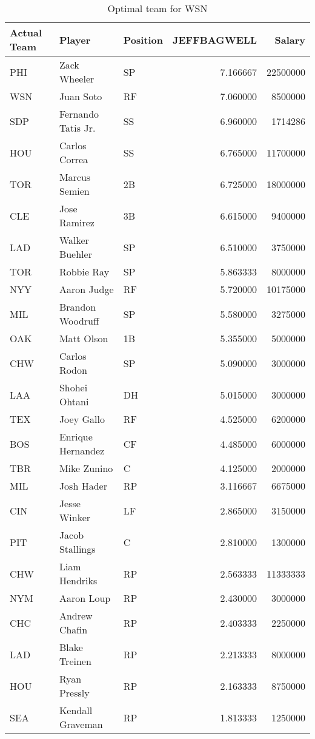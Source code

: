 \begin{table}

\caption{Optimal team for WSN}
\centering
\begin{tabular}[t]{l|l|l|r|r}
\hline
Actual Team & Player & Position & JEFFBAGWELL & Salary\\
\hline
PHI & Zack Wheeler & SP & 7.166667 & 22500000\\
\hline
WSN & Juan Soto & RF & 7.060000 & 8500000\\
\hline
SDP & Fernando Tatis Jr. & SS & 6.960000 & 1714286\\
\hline
HOU & Carlos Correa & SS & 6.765000 & 11700000\\
\hline
TOR & Marcus Semien & 2B & 6.725000 & 18000000\\
\hline
CLE & Jose Ramirez & 3B & 6.615000 & 9400000\\
\hline
LAD & Walker Buehler & SP & 6.510000 & 3750000\\
\hline
TOR & Robbie Ray & SP & 5.863333 & 8000000\\
\hline
NYY & Aaron Judge & RF & 5.720000 & 10175000\\
\hline
MIL & Brandon Woodruff & SP & 5.580000 & 3275000\\
\hline
OAK & Matt Olson & 1B & 5.355000 & 5000000\\
\hline
CHW & Carlos Rodon & SP & 5.090000 & 3000000\\
\hline
LAA & Shohei Ohtani & DH & 5.015000 & 3000000\\
\hline
TEX & Joey Gallo & RF & 4.525000 & 6200000\\
\hline
BOS & Enrique Hernandez & CF & 4.485000 & 6000000\\
\hline
TBR & Mike Zunino & C & 4.125000 & 2000000\\
\hline
MIL & Josh Hader & RP & 3.116667 & 6675000\\
\hline
CIN & Jesse Winker & LF & 2.865000 & 3150000\\
\hline
PIT & Jacob Stallings & C & 2.810000 & 1300000\\
\hline
CHW & Liam Hendriks & RP & 2.563333 & 11333333\\
\hline
NYM & Aaron Loup & RP & 2.430000 & 3000000\\
\hline
CHC & Andrew Chafin & RP & 2.403333 & 2250000\\
\hline
LAD & Blake Treinen & RP & 2.213333 & 8000000\\
\hline
HOU & Ryan Pressly & RP & 2.163333 & 8750000\\
\hline
SEA & Kendall Graveman & RP & 1.813333 & 1250000\\
\hline
\end{tabular}
\end{table}
